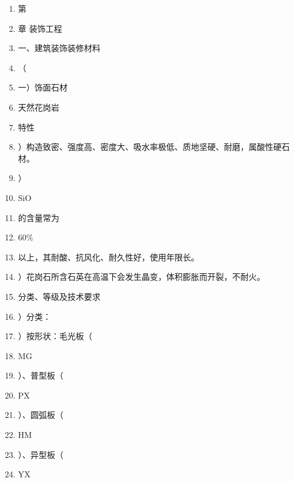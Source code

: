 \documentclass[UTF8,fontset=fandol,11pt]{ctexart}
\begin{document}
\begin{enumerate}[label=\arabic*.]

\item 第

\item 章 装饰工程

\item 一、建筑装饰装修材料

\item （

\item 一）饰面石材

\item 天然花岗岩

\item 特性

\item ）构造致密、强度高、密度大、吸水率极低、质地坚硬、耐磨，属酸性硬石材。

\item ）

\item SiO

\item 的含量常为

\item 60\%

\item 以上，其耐酸、抗风化、耐久性好，使用年限长。

\item ）花岗石所含石英在高温下会发生晶变，体积膨胀而开裂，不耐火。

\item 分类、等级及技术要求

\item ）分类：

\item ）按形状：毛光板（

\item MG

\item ）、普型板（

\item PX

\item ）、圆弧板（

\item HM

\item ）、异型板（

\item YX

\end{enumerate}
\end{document}
